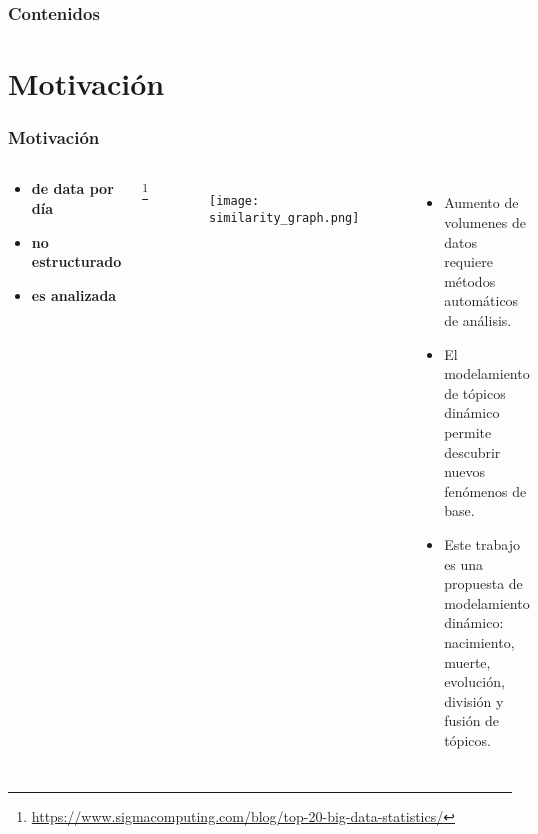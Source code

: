 \documentclass[
	spanish, %
	aspectratio=43, %
	hyperref={pdfencoding=auto,psdextra},
	xcolor={dvipsnames,table,usenames},
]{beamer}
\title[\documentsubtitle]{\documenttitle}
\subtitle{\documentsubject}
\author[\documentauthor]{
	\documentauthor \newline\newline
Profesor guía: Richard Weber \newline
Miembros de la comisión: Giorgiogiulio Parra, Ángel Jiménez
}
\institute[UChile]{
	\texttt{[image: \\universitydepartmentimage]} \\
	\medskip
	\universityname \\
	\universityfaculty \\
	\universitydepartment
}
\date[\today]{\footnotesize{\today}}
\begin{document}
\templatePagecfg

\templateFinalcfg

\newcommand\blfootnote[1]{%
  \begingroup
  \renewcommand\thefootnote{}\footnote{#1}%
  \addtocounter{footnote}{-1}%
  \endgroup
}

\begin{frame}
	\titlepage
\end{frame}

\begin{frame}
	\frametitle{Contenidos}
	\tableofcontents
\end{frame}
\section{Motivación}
\begin{frame}[t]
\frametitle{Motivación} 
\begin{columns}[t]
  \begin{center}
    \begin{minipage}{0.8\textwidth}
    \begin{itemize}
    \item[] \textbf{\scalebox{1.5}{\textcolor{royalblue}{2 EB}} de data por día} %
    \item[] \textbf{\scalebox{1.5}{\textcolor{royalblue}{80\%}} no estructurado}
    \item[] \textbf{\scalebox{1.5}{\textcolor{royalblue}{12\%}} es analizada}
    \end{itemize}
    \end{minipage}
   \end{center}
  \blfootnote{\url{https://www.sigmacomputing.com/blog/top-20-big-data-statistics/}}
  
  \vspace*{-0.2in}
  \begin{figure}
  \texttt{[image: similarity\_graph.png]} 
  \end{figure}

  \begin{itemize}
    \item Aumento de volumenes de datos requiere métodos automáticos de análisis. 
    \item El modelamiento de tópicos dinámico permite descubrir nuevos fenómenos de base.%
    \item Este trabajo es una propuesta de modelamiento dinámico: nacimiento, muerte, evolución, división y fusión de tópicos.
  \end{itemize}
\end{columns}
\end{frame}
\end{document}
